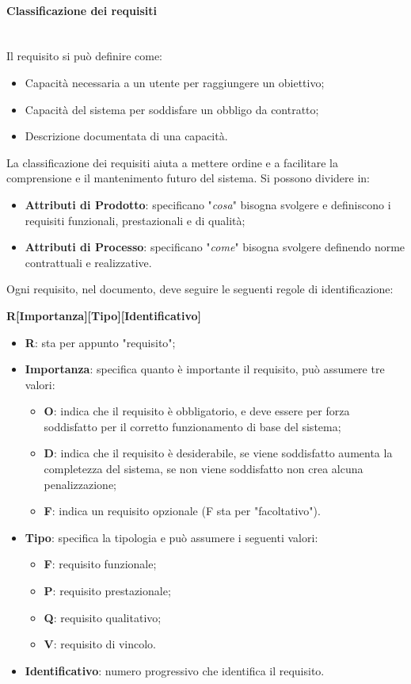 \paragraph{Classificazione dei requisiti} \-\\
Il requisito si può definire come:
\begin{itemize}
	\item Capacità necessaria a un utente per raggiungere un obiettivo;
	\item Capacità del sistema per soddisfare un obbligo da contratto;
	\item Descrizione documentata di una capacità.
\end{itemize}
La classificazione dei requisiti aiuta a mettere ordine e a facilitare la comprensione e il mantenimento futuro del sistema. Si possono dividere in:
\begin{itemize}
	\item \textbf{Attributi di Prodotto}: specificano "\textit{cosa}" bisogna svolgere e definiscono i requisiti funzionali, prestazionali e di qualità;
	\item \textbf{Attributi di Processo}: specificano "\textit{come}" bisogna svolgere definendo norme contrattuali e realizzative. 
\end{itemize}
Ogni requisito, nel documento, deve seguire le seguenti regole di identificazione:
\begin{center}
\textbf{R[Importanza][Tipo][Identificativo]}
\end{center}  
\begin{itemize}
	\item \textbf{R}: sta per appunto "requisito";
	\item \textbf{Importanza}: specifica quanto è importante il requisito, può assumere tre valori:
	\begin{itemize}
			\item \textbf{O}: indica che il requisito è obbligatorio, e deve essere per forza soddisfatto per il corretto funzionamento di base del sistema;
			\item \textbf{D}: indica che il requisito è desiderabile, se viene soddisfatto aumenta la completezza del sistema, se non viene soddisfatto non crea alcuna penalizzazione;
			\item \textbf{F}: indica un requisito opzionale (F sta per "facoltativo"). 
	\end{itemize}
	\item \textbf{Tipo}: specifica la tipologia e può assumere i seguenti valori:
	\begin{itemize}
		\item \textbf{F}: requisito funzionale;
		\item \textbf{P}: requisito prestazionale;
		\item \textbf{Q}: requisito qualitativo;
		\item \textbf{V}: requisito di vincolo.
	\end{itemize}
	\item \textbf{Identificativo}: numero progressivo che identifica il requisito.
\end{itemize}

